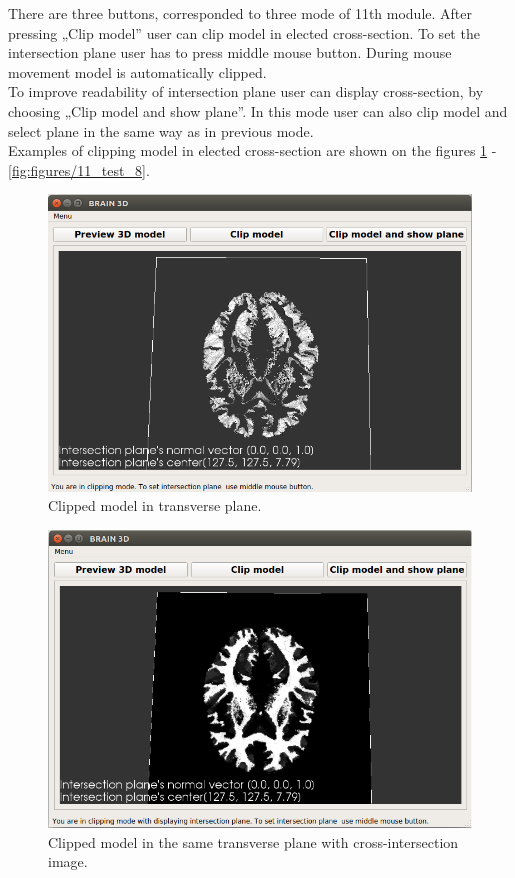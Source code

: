 \indent There are three buttons, corresponded to three mode of 11th module. After pressing „Clip model” user can clip model in elected cross-section. To set the intersection plane user has to press middle mouse button. During mouse movement model is automatically clipped.\\
\indent To improve readability of intersection plane user can display cross-section, by choosing „Clip model and show plane”. In this mode user can also clip model and select plane in the same way as in previous mode.\\
\indent Examples of clipping model in elected cross-section are shown on the figures \ref{fig:figures/11_test_3} - \ref{fig:figures/11_test_8}.
\begin{figure}[H]
\centering{}\includegraphics[scale=0.7]{figures/Module_11/11_test_3.png}\caption{Clipped model in transverse plane. \label{fig:figures/11_test_3}}
\end{figure}
\begin{figure}[H]
\centering{}\includegraphics[scale=0.7]{figures/Module_11/11_test_4.png}\caption{Clipped model in the same transverse plane with cross-intersection image. \label{fig:figures/11_test_4}}
\end{figure}
